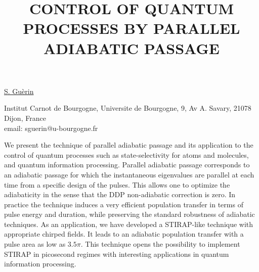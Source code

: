 \title{CONTROL OF QUANTUM PROCESSES BY PARALLEL ADIABATIC PASSAGE}

\underline{S. Gu\`{e}rin}


Institut Carnot de Bourgogne,
Universite de Bourgogne,
9, Av A. Savary,
21078 Dijon,
France\\
email: sguerin@u-bourgogne.fr

We present the technique of parallel adiabatic passage and its application to the control of quantum processes such as state-selectivity for atoms and molecules, and quantum information processing. Parallel adiabatic passage corresponds to an adiabatic passage for which the instantaneous eigenvalues are parallel at each time from a specific design of the pulses. This allows one to optimize the adiabaticity in the sense that the DDP non-adiabatic correction is zero. In practice the technique induces a very efficient population transfer in terms of pulse energy and duration, while preserving the standard robustness of adiabatic techniques. As an application, we have developed a STIRAP-like technique with appropriate chirped fields. It leads to an adiabatic population transfer with a pulse area as low as $3.5\pi$. This technique opens the possibility to implement STIRAP in picosecond regimes with interesting applications in quantum information processing.

\vspace{\baselineskip}